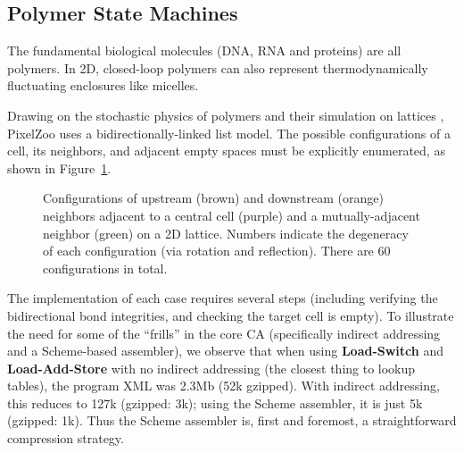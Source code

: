 \documentclass{acm_proc_article-sp}
\begin{document}
\subsection{Polymer State Machines}
\label{sec:PolymerStateMachines}

The fundamental biological molecules (DNA, RNA and proteins) are all polymers.
In 2D, closed-loop polymers can also represent thermodynamically fluctuating enclosures like micelles.

Drawing on the stochastic physics of polymers \cite{DoiEdwards1988}
and their simulation on lattices \cite{PhysRevLett.64.1915,journals/pc/OstrovskyCSB01},
PixelZoo uses a bidirectionally-linked list model.
The possible configurations of a cell, its neighbors, and adjacent empty spaces must
be explicitly enumerated, as shown in Figure~\ref{fig:polymer}.

\begin{figure}
\caption{
\label{fig:polymer}
Configurations of upstream (brown) and downstream (orange) neighbors adjacent to a central cell (purple) and a mutually-adjacent neighbor (green) on a 2D lattice.
Numbers indicate the degeneracy of each configuration (via rotation and reflection).
There are 60 configurations in total.
}
\end{figure}

The implementation of each case requires several steps (including verifying the bidirectional bond integrities,
and checking the target cell is empty).
To illustrate the need for some of the ``frills'' in the core CA
(specifically indirect addressing and a Scheme-based assembler),
we observe that when using {\bf Load-Switch} and {\bf Load-Add-Store}
with no indirect addressing (the closest thing to lookup tables), the program XML was 2.3Mb (52k gzipped).
With indirect addressing, this reduces to 127k (gzipped: 3k);
using the Scheme assembler, it is just 5k (gzipped: 1k).
Thus the Scheme assembler is, first and foremost, a straightforward compression strategy.
\end{document}

